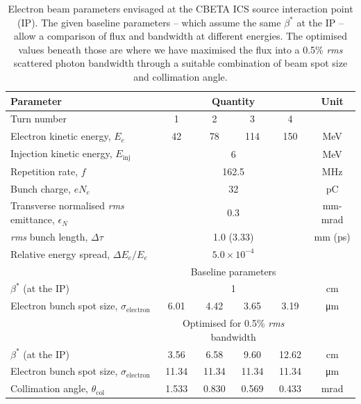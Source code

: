 \documentclass[../main.tex]{subfiles}
\begin{document}
\begin{table}[!h]
\caption{Electron beam parameters envisaged at the CBETA ICS source interaction point (IP). The given baseline parameters -- which assume the same $\beta^*$ at the IP -- allow a comparison of flux and bandwidth at different energies. The optimised values beneath those are where we have maximised the flux into a 0.5\% \textit{rms} scattered photon bandwidth through a suitable combination of beam spot size and collimation angle.}
\vspace{3mm}
\begin{tabular}{lccccc}
\hline\hline
Parameter & \multicolumn{4}{c}{Quantity} & Unit \\
\hline
Turn number & 1 & 2 & 3 & 4 & \\
Electron kinetic energy, $E_e$ & 42 & 78 & 114 & 150 & \si{\mega\electronvolt}\\
Injection kinetic energy, $E_{\mathrm{inj}}$ & \multicolumn{4}{c}{6} & \si{\mega\electronvolt} \\
Repetition rate, $f$ & \multicolumn{4}{c}{162.5} & \si{\mega\hertz}\\
Bunch charge, $e N_e$ & \multicolumn{4}{c}{32} & \si{\pico\coulomb} \\
Transverse normalised \textit{rms} emittance, $\epsilon_{N}$ & \multicolumn{4}{c}{0.3} & \si{\milli\meter}-\si{\milli\radian}\\
\textit{rms} bunch length, $\Delta \tau$ & \multicolumn{4}{c}{1.0 (3.33)} & \si{\milli\meter} (\si{\pico\second})\\
Relative energy spread, $\Delta E_{e}/E_{e}$ & \multicolumn{4}{c}{$5.0\times 10^{-4}$} & \\
\hline
 & \multicolumn{4}{c}{Baseline parameters} & \\
\hline
$\beta^*$ (at the IP) & \multicolumn{4}{c}{1} & \si{\centi\meter}\\
Electron bunch spot size, $\sigma_{\mathrm{electron}}$ & 6.01 & 4.42 & 3.65 & 3.19  & \si{\micro\meter} \\
\hline
 & \multicolumn{4}{c}{Optimised for 0.5\% \textit{rms} bandwidth} & \\
\hline
$\beta^*$ (at the IP) & 3.56 & 6.58 & 9.60 & 12.62 & \si{\centi\meter}\\
Electron bunch spot size, $\sigma_{\mathrm{electron}}$ & 11.34 & 11.34 & 11.34 & 11.34  & \si{\micro\meter}\\
Collimation angle, $\theta_{\mathrm{col}}$ & 1.533 & 0.830 & 0.569 & 0.433 & \si{\milli\radian}\\
\hline\hline
\end{tabular}
\label{TABLE:CBETA_electron_beam_design_parameters}
\end{table}
\end{document}
